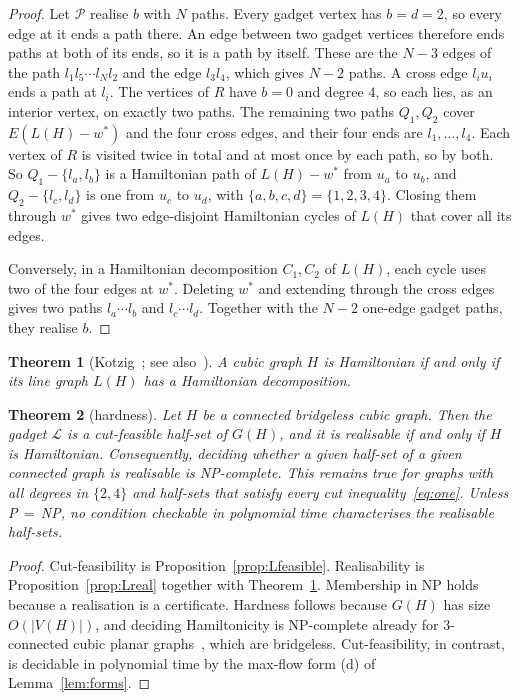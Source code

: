 \documentclass[11pt]{amsart}
\newtheorem{theorem}{Theorem}
\theoremstyle{definition}
\begin{document}
\begin{proof}
Let $\mathcal P$ realise $b$ with $N$ paths. Every gadget vertex has $b=d=2$, so every edge at it ends
a path there. An edge between two gadget vertices therefore ends paths at both of its ends, so it is a
path by itself. These are the $N-3$ edges of the path $l_1l_5\cdots l_Nl_2$ and the edge $l_3l_4$,
which gives $N-2$ paths. A cross edge $l_iu_i$ ends a path at $l_i$. The vertices of $R$ have $b=0$
and degree $4$, so each lies, as an interior vertex, on exactly two paths. The remaining two paths
$Q_1,Q_2$ cover $E(L(H)-w^*)$ and the four cross edges, and their four ends are $l_1,\dots,l_4$. Each
vertex of $R$ is visited twice in total and at most once by each path, so by both. So $Q_1-\{l_a,l_b\}$
is a Hamiltonian path of $L(H)-w^*$ from $u_a$ to $u_b$, and $Q_2-\{l_c,l_d\}$ is one from $u_c$ to
$u_d$, with $\{a,b,c,d\}=\{1,2,3,4\}$. Closing them through $w^*$ gives two edge-disjoint Hamiltonian
cycles of $L(H)$ that cover all its edges.

Conversely, in a Hamiltonian decomposition $C_1,C_2$ of $L(H)$, each cycle uses two of the four edges
at $w^*$. Deleting $w^*$ and extending through the cross edges gives two paths $l_a\cdots l_b$ and
$l_c\cdots l_d$. Together with the $N-2$ one-edge gadget paths, they realise $b$.
\end{proof}

\begin{theorem}[Kotzig~\cite{Kot57}; see also~\cite{Ber78}]\label{thm:kotzig}
A cubic graph $H$ is Hamiltonian if and only if its line graph $L(H)$ has a Hamiltonian decomposition.
\end{theorem}

\begin{theorem}[hardness]\label{thm:hard}
Let $H$ be a connected bridgeless cubic graph. Then the gadget $\mathcal L$ is a cut-feasible half-set
of $G(H)$, and it is realisable if and only if $H$ is Hamiltonian. Consequently, deciding whether a
given half-set of a given connected graph is realisable is NP-complete. This remains true for graphs
with all degrees in $\{2,4\}$ and half-sets that satisfy every cut inequality~\eqref{eq:one}. Unless
P$\,=\,$NP, no condition checkable in polynomial time characterises the realisable half-sets.
\end{theorem}

\begin{proof}
Cut-feasibility is Proposition~\ref{prop:Lfeasible}. Realisability is Proposition~\ref{prop:Lreal}
together with Theorem~\ref{thm:kotzig}. Membership in NP holds because a realisation is a certificate.
Hardness follows because $G(H)$ has size $O(|V(H)|)$, and deciding Hamiltonicity is NP-complete
already for $3$-connected cubic planar graphs~\cite{GJT76}, which are bridgeless. Cut-feasibility, in
contrast, is decidable in polynomial time by the max-flow form (d) of Lemma~\ref{lem:forms}.
\end{proof}
\end{document}
